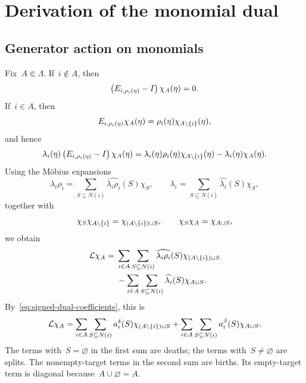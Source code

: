 \section{Derivation of the monomial dual}
\label{app:dual-calculation}

\subsection{Generator action on monomials}
\label{app:generator-action}

Fix~$A\Subset\Lambda$. If~$i\notin A$, then
\begin{equation*}
\left(E_{i,\rho_i(\eta)}-I\right)\chi_A(\eta)=0.
\end{equation*}
If~$i\in A$, then
\begin{equation*}
E_{i,\rho_i(\eta)}\chi_A(\eta)
=
\rho_i(\eta)\chi_{A\setminus\left\{i\right\}}(\eta),
\end{equation*}
and hence
\begin{equation*}
\lambda_i(\eta)\left(E_{i,\rho_i(\eta)}-I\right)\chi_A(\eta)
=
\lambda_i(\eta)\rho_i(\eta)\chi_{A\setminus\left\{i\right\}}(\eta)
-
\lambda_i(\eta)\chi_A(\eta).
\end{equation*}
Using the M\"obius expansions
\begin{equation*}
\lambda_i\rho_i
=
\sum_{S\subseteq N(i)}\widehat{\lambda_i\rho_i}(S)\chi_S,
\qquad
\lambda_i
=
\sum_{S\subseteq N(i)}\widehat{\lambda_i}(S)\chi_S,
\end{equation*}
together with
\begin{equation*}
\chi_S\chi_{A\setminus\left\{i\right\}}
=
\chi_{\left(A\setminus\left\{i\right\}\right)\cup S},
\qquad
\chi_S\chi_A=\chi_{A\cup S},
\end{equation*}
we obtain
\begin{align*}
\mathcal{L}\chi_A
={}&
\sum_{i\in A}\sum_{S\subseteq N(i)}
\widehat{\lambda_i\rho_i}(S)
\chi_{\left(A\setminus\left\{i\right\}\right)\cup S}
\\
&-
\sum_{i\in A}\sum_{S\subseteq N(i)}
\widehat{\lambda_i}(S)\chi_{A\cup S}.
\end{align*}
By~\eqref{eq:signed-dual-coefficients}, this is
\begin{equation}
\label{eq:generator-action-monomials}
\mathcal{L}\chi_A
=
\sum_{i\in A}\sum_{S\subseteq N(i)}
a_i^\delta(S)\chi_{\left(A\setminus\left\{i\right\}\right)\cup S}
+
\sum_{i\in A}\sum_{S\subseteq N(i)}
a_i^\beta(S)\chi_{A\cup S}.
\end{equation}
The terms with~$S=\varnothing$ in the first sum are deaths; the terms
with~$S\neq\varnothing$ are splits. The nonempty-target terms in the second sum
are births. Its empty-target term is diagonal
because~$A\cup\varnothing=A$.

